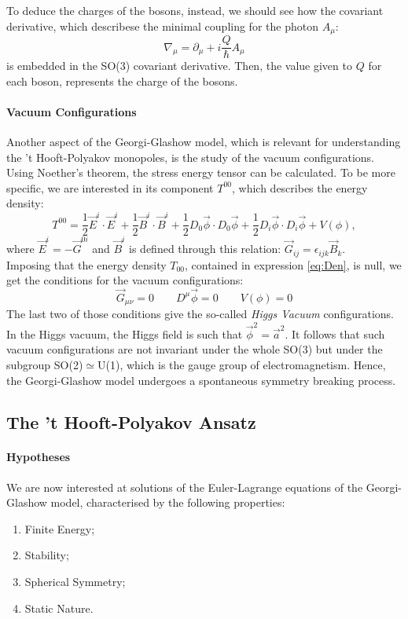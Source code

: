 \documentclass[main.tex]{subfiles}
\begin{document}
To deduce the charges of the bosons, instead, we should see how the covariant derivative, which describese the minimal coupling for the photon $A_{\mu}$: 
\begin{equation}
\nabla_\mu = \partial_\mu + i \frac{Q}{\hbar} A_{\mu}
\end{equation}
is embedded in the SO(3) covariant derivative. Then, the value given to $Q$ for each boson, represents the charge of the bosons. 

\paragraph{Vacuum Configurations}Another aspect of the Georgi-Glashow model, which is relevant for understanding the 't Hooft-Polyakov monopoles, is the study of the vacuum configurations.\\
Using Noether's theorem, the stress energy tensor can be calculated. To be more specific, we are interested in its component $T^{00}$, which describes the energy density: 
\begin{equation}
T^{00} = \frac{1}{2} \Vec{E}^i \cdot  \Vec{E}^i + \frac{1}{2} \Vec{B}^i \cdot \Vec{B}^i +\frac{1}{2} D_0 \Vec{\phi} \cdot D_0 \Vec{\phi} +\frac{1}{2} D_i \Vec{\phi} \cdot  D_i \Vec{\phi} + V(\phi),
\label{eq:Den}
\end{equation}
where $\Vec{E}^i = - \Vec{G}^{0i}$  and $\Vec{B}^i$ is defined through this relation: $ \Vec{G}_{ij} = \epsilon_{ijk} \Vec{B}_k$.\\
Imposing that the energy density $T_{00}$, contained in expression \ref{eq:Den}, is null, we get the conditions for the vacuum configurations: 
\begin{equation}
\Vec{G}_{\mu \nu} = 0 \qquad D^{\mu} \Vec{\phi}  = 0 \qquad V(\phi)=0
\end{equation}
The last two of those conditions give the so-called \textit{Higgs Vacuum} configurations. 
In the Higgs vacuum, the Higgs field is such that $\vec{\phi}^2 = \vec{a}^2$. It follows that such vacuum configurations are not invariant under the whole SO(3) but under the subgroup SO(2)$\simeq$U(1), which is the gauge group of electromagnetism. Hence, the Georgi-Glashow model undergoes a spontaneous symmetry breaking process.

\subsection{The 't Hooft-Polyakov Ansatz}
\label{sect:Ansatz}
 \paragraph{Hypotheses}We are now interested at solutions of the Euler-Lagrange equations of the Georgi-Glashow model, characterised by the following properties: 
 \begin{enumerate}
     \item Finite Energy; 
     \item Stability; 
     \item Spherical Symmetry;
     \item Static Nature.
 \end{enumerate}
 
\end{document}
